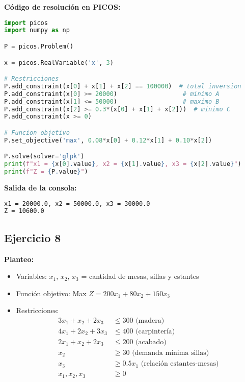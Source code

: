 \documentclass[12pt]{article}
\begin{document}
\textbf{Código de resolución en PICOS:}
\begin{lstlisting}[language=Python]
import picos
import numpy as np

P = picos.Problem()

x = picos.RealVariable('x', 3)

# Restricciones
P.add_constraint(x[0] + x[1] + x[2] == 100000)  # total inversion
P.add_constraint(x[0] >= 20000)                  # minimo A
P.add_constraint(x[1] <= 50000)                  # maximo B
P.add_constraint(x[2] >= 0.3*(x[0] + x[1] + x[2]))  # minimo C
P.add_constraint(x >= 0)

# Funcion objetivo
P.set_objective('max', 0.08*x[0] + 0.12*x[1] + 0.10*x[2])

P.solve(solver='glpk')
print(f"x1 = {x[0].value}, x2 = {x[1].value}, x3 = {x[2].value}")
print(f"Z = {P.value}")
\end{lstlisting}

\textbf{Salida de la consola:}
\begin{lstlisting}[language=bash,backgroundcolor=\color{black},basicstyle=\color{white}\ttfamily,numbers=none]
x1 = 20000.0, x2 = 50000.0, x3 = 30000.0
Z = 10600.0
\end{lstlisting}

\subsection{Ejercicio 8}

\textbf{Planteo:}
\begin{itemize}
\item Variables: $x_1$, $x_2$, $x_3$ = cantidad de mesas, sillas y estantes
\item Función objetivo: Max $Z = 200x_1 + 80x_2 + 150x_3$
\item Restricciones:
  \begin{align*}
  3x_1 + x_2 + 2x_3 &\leq 300 \text{ (madera)} \\
  4x_1 + 2x_2 + 3x_3 &\leq 400 \text{ (carpintería)} \\
  2x_1 + x_2 + 2x_3 &\leq 200 \text{ (acabado)} \\
  x_2 &\geq 30 \text{ (demanda mínima sillas)} \\
  x_3 &\geq 0.5x_1 \text{ (relación estantes-mesas)} \\
  x_1, x_2, x_3 &\geq 0
  \end{align*}
\end{itemize}
\end{document}
